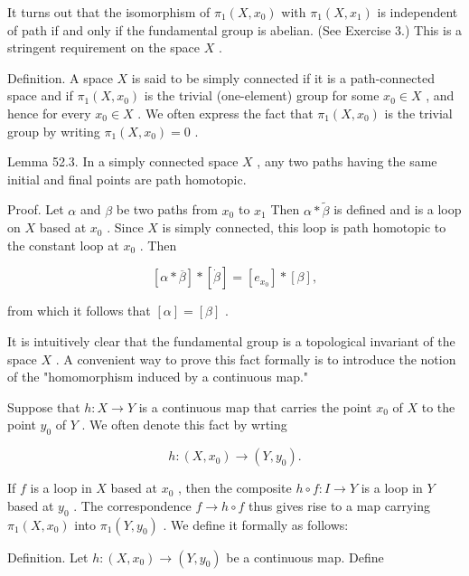 \documentclass[10pt]{article}
\begin{document}
It turns out that the isomorphism of \({\pi }_{1}\left( {X,{x}_{0}}\right)\) with \({\pi }_{1}\left( {X,{x}_{1}}\right)\) is independent of path if and only if the fundamental group is abelian. (See Exercise 3.) This is a stringent requirement on the space \(X\) .

Definition. A space \(X\) is said to be simply connected if it is a path-connected space and if \({\pi }_{1}\left( {X,{x}_{0}}\right)\) is the trivial (one-element) group for some \({x}_{0} \in  X\) , and hence for every \({x}_{0} \in  X\) . We often express the fact that \({\pi }_{1}\left( {X,{x}_{0}}\right)\) is the trivial group by writing \({\pi }_{1}\left( {X,{x}_{0}}\right)  = 0\) .

Lemma 52.3. In a simply connected space \(X\) , any two paths having the same initial and final points are path homotopic.

Proof. Let \(\alpha\) and \(\beta\) be two paths from \({x}_{0}\) to \({x}_{1}\) Then \(\alpha  * \widetilde{\beta }\) is defined and is a loop on \(X\) based at \({x}_{0}\) . Since \(X\) is simply connected, this loop is path homotopic to the constant loop at \({x}_{0}\) . Then

\[
\left\lbrack  {\alpha  * \overline{\beta }}\right\rbrack   * \left\lbrack  \dot{\beta }\right\rbrack   = \left\lbrack  {e}_{{x}_{0}}\right\rbrack   * \left\lbrack  \beta \right\rbrack  ,
\]

from which it follows that \(\left\lbrack  \alpha \right\rbrack   = \left\lbrack  \beta \right\rbrack\) .

It is intuitively clear that the fundamental group is a topological invariant of the space \(X\) . A convenient way to prove this fact formally is to introduce the notion of the "homomorphism induced by a continuous map."

Suppose that \(h : X \rightarrow  Y\) is a continuous map that carries the point \({x}_{0}\) of \(X\) to the point \({y}_{0}\) of \(Y\) . We often denote this fact by wrting

\[
h : \left( {X,{x}_{0}}\right)  \rightarrow  \left( {Y,{y}_{0}}\right) .
\]

If \(f\) is a loop in \(X\) based at \({x}_{0}\) , then the composite \(h \circ  f : I \rightarrow  Y\) is a loop in \(Y\) based at \({y}_{0}\) . The correspondence \(f \rightarrow  h \circ  f\) thus gives rise to a map carrying \({\pi }_{1}\left( {X,{x}_{0}}\right)\) into \({\pi }_{1}\left( {Y,{y}_{0}}\right)\) . We define it formally as follows:

Definition. Let \(h : \left( {X,{x}_{0}}\right)  \rightarrow  \left( {Y,{y}_{0}}\right)\) be a continuous map. Define
\end{document}
